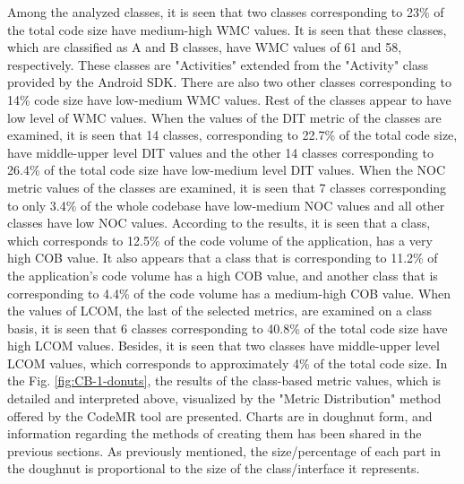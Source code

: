 Among the analyzed classes, it is seen that two classes corresponding to 23\% of the total code size have medium-high WMC values. It is seen that these classes, which are classified as A and B classes, have WMC values of 61 and 58, respectively. These classes are "Activities" extended from the "Activity" class provided by the Android SDK. There are also two other classes corresponding to 14\% code size have low-medium WMC values. Rest of the classes appear to have low level of WMC values.  When the values of the DIT metric of the classes are examined, it is seen that 14 classes, corresponding to 22.7\% of the total code size, have middle-upper level DIT values and the other 14 classes corresponding to 26.4\% of the total code size have low-medium level DIT values. When the NOC metric values of the classes are examined, it is seen that 7 classes corresponding to only 3.4\% of the whole codebase have low-medium NOC values and all other classes have low NOC values. According to the results, it is seen that a class, which corresponds to 12.5\% of the code volume of the application, has a very high COB value. It also appears that a class that is corresponding to 11.2\% of the application's code volume has a high COB value, and another class that is corresponding to 4.4\% of the code volume has a medium-high COB value. When the values of LCOM, the last of the selected metrics, are examined on a class basis, it is seen that 6 classes corresponding to 40.8\% of the total code size have high LCOM values. Besides, it is seen that two classes have middle-upper level LCOM values, which corresponds to approximately 4\% of the total code size. In the Fig. \ref{fig:CB-1-donuts}, the results of the class-based metric values, which is detailed and interpreted above, visualized by the "Metric Distribution" method offered by the CodeMR tool are presented. Charts are in doughnut form, and information regarding the methods of creating them has been shared in the previous sections. As previously mentioned,  the size/percentage of each part in the doughnut is proportional to the size of the class/interface it represents.

